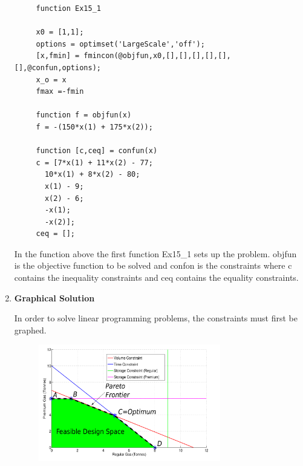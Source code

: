 \begin{enumerate}
  \begin{framed}
   \begin{verbatim}
     function Ex15_1

     x0 = [1,1];
     options = optimset('LargeScale','off');
     [x,fmin] = fmincon(@objfun,x0,[],[],[],[],[],[],@confun,options);
     x_o = x
     fmax =-fmin

     function f = objfun(x)
     f = -(150*x(1) + 175*x(2));  
     
     function [c,ceq] = confun(x)
     c = [7*x(1) + 11*x(2) - 77;
       10*x(1) + 8*x(2) - 80;
       x(1) - 9;
       x(2) - 6;
       -x(1);
       -x(2)];
     ceq = [];  
   \end{verbatim}
  \end{framed}

  In the function above the first function Ex15\_1 sets up the
  problem. objfun is the objective function to be solved and confon is
  the constraints where c contains the inequality constraints and ceq
  contains the equality constraints. 

\item {\bf Graphical Solution}

  In order to solve linear programming problems, the constraints must
  first be graphed. 

  \begin{figure}[H]
    \begin{center}
      \includegraphics[height=0.45\textwidth,width=0.75\textwidth]{Graphics/Gas_Processing}
    \end{center}
  \end{figure}


\end{enumerate}
